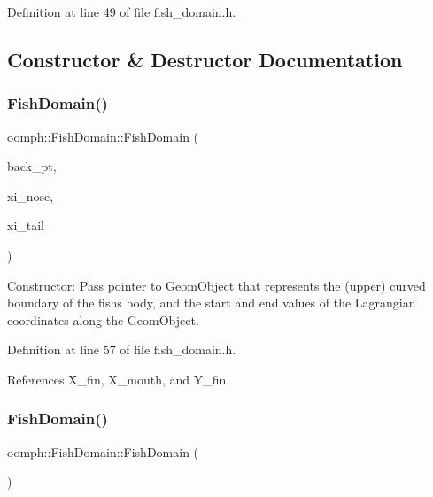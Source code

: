 Definition at line 49 of file fish\+\_\+domain.\+h.



\subsection{Constructor \& Destructor Documentation}
\mbox{\label{classoomph_1_1FishDomain_a96f1e192900962ee55d063577822cd12}} 
\subsubsection{\texorpdfstring{Fish\+Domain()}{FishDomain()}\hspace{0.1cm}{\footnotesize\ttfamily [1/2]}}
{\footnotesize\ttfamily oomph\+::\+Fish\+Domain\+::\+Fish\+Domain (\begin{DoxyParamCaption}\item[{Geom\+Object $\ast$}]{back\+\_\+pt,  }\item[{const double \&}]{xi\+\_\+nose,  }\item[{const double \&}]{xi\+\_\+tail }\end{DoxyParamCaption})\hspace{0.3cm}{\ttfamily [inline]}}



Constructor\+: Pass pointer to Geom\+Object that represents the (upper) curved boundary of the fish\textquotesingle{}s body, and the start and end values of the Lagrangian coordinates along the Geom\+Object. 



Definition at line 57 of file fish\+\_\+domain.\+h.



References X\+\_\+fin, X\+\_\+mouth, and Y\+\_\+fin.

\mbox{\label{classoomph_1_1FishDomain_a9436a46493f270e194b1cff950c6670e}} 
\subsubsection{\texorpdfstring{Fish\+Domain()}{FishDomain()}\hspace{0.1cm}{\footnotesize\ttfamily [2/2]}}
{\footnotesize\ttfamily oomph\+::\+Fish\+Domain\+::\+Fish\+Domain (\begin{DoxyParamCaption}\item[{const \hyperlink{classoomph_1_1FishDomain}{Fish\+Domain} \&}]{ }\end{DoxyParamCaption})\hspace{0.3cm}{\ttfamily [inline]}}



